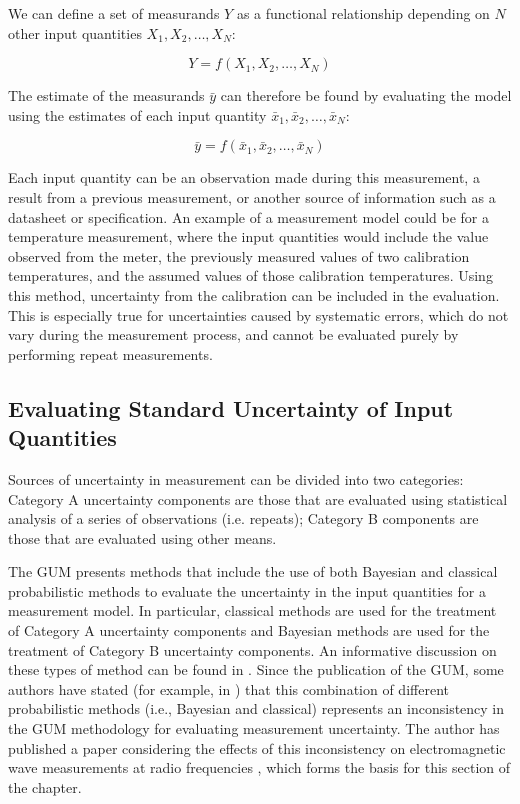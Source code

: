 \documentclass[../thesis/thesis.tex]{subfiles}
\begin{document}
\begin{refsection}
We can define a set of measurands $Y$ as a functional relationship depending on $N$ other input quantities $X_1, X_2, \dots, X_N$:

\begin{equation}
Y=f(X_1,X_2,\dots,X_N)
\end{equation}

The estimate of the measurands $\bar{y}$ can therefore be found by evaluating the model using the estimates of each input quantity $\bar{x}_1,\bar{x}_2,…,\bar{x}_N$:

\begin{equation}
\bar{y}=f(\bar{x}_1,\bar{x}_2,…,\bar{x}_N)
\end{equation}

Each input quantity can be an observation made during this measurement, a result from a previous measurement, or another source of information such as a datasheet or specification. An example of a measurement model could be for a temperature measurement, where the input quantities would include the value observed from the meter, the previously measured values of two calibration temperatures, and the assumed values of those calibration temperatures. Using this method, uncertainty from the calibration can be included in the evaluation. This is especially true for uncertainties caused by systematic errors, which do not vary during the measurement process, and cannot be evaluated purely by performing repeat measurements.

\subsection{Evaluating Standard Uncertainty of Input Quantities}

Sources of uncertainty in measurement can be divided into two categories: Category A uncertainty components are those that are evaluated using statistical analysis of a series of observations (i.e. repeats); Category B components are those that are evaluated using other means.

The GUM presents methods that include the use of both Bayesian and classical probabilistic methods to evaluate the uncertainty in the input quantities for a measurement model. In particular, classical methods \cite{Neyman_1937} are used for the treatment of Category A uncertainty components and Bayesian methods \cite{Gelman_2013} are used for the treatment of Category B uncertainty components. An informative discussion on these types of method can be found in \cite{White_2016}. Since the publication of the GUM, some authors have stated (for example, in \cite{Kacker_2006,Kacker_2005,Kacker_2003,Bich_2014}) that this combination of different probabilistic methods (i.e., Bayesian and classical) represents an inconsistency in the GUM methodology for evaluating measurement uncertainty. The author has published a paper considering the effects of this inconsistency on electromagnetic wave measurements at radio frequencies \cite{Stant_2016}, which forms the basis for this section of the chapter.


\end{refsection}
\end{document}
